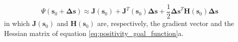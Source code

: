 \begin{equation}
\Psi(\mathbf{s}_0 + \mathbf{\Delta s}) \approx \mathbf{J}(\mathbf{s}_0) + \mathbf{J}^T(\mathbf{s}_0)  \mathbf{\Delta s} + 
\frac{1}{2} \mathbf{\Delta s}^T \mathbf{H}(\mathbf{s}_0) \mathbf{\Delta s}
\label{eq:sec_ord_goal}
\end{equation}
in which $\mathbf{J}(\mathbf{s}_0)$ and $\mathbf{H}(\mathbf{s}_0)$ are, respectively, the gradient vector and the Hessian matrix of equation \ref{eq:positivity_goal_function}a.
         

%
%
%
